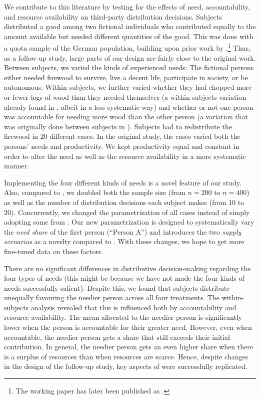 \documentclass[egregdoesnotlikesansseriftitles]{scrartcl}
\begin{document}
We contribute to this literature by testing for the effects of need, accountability, and resource availability on third-party distribution decisions.
Subjects distributed a good among two fictional individuals who contributed equally to the amount available but needed different quantities of the good.
This was done with a quota sample of the German population, building upon prior work by \cite{bauer_need_2020}.\footnote{The working paper \cite{bauer_need_2020} has later been published as \cite{bauer_need_2022}.}
Thus, as a follow-up study, large parts of our design are fairly close to the original work.
Between subjects, we varied the kinds of experienced needs: The fictional persons either needed firewood to survive, live a decent life, participate in society, or be autonomous.
Within subjects, we further varied whether they had chopped more or fewer logs of wood than they needed themselves (a within-subjects variation already found in \citealt{bauer_need_2020}, albeit in a less systematic way) and whether or not one person was accountable for needing more wood than the other person (a variation that was originally done between subjects in \citealt{bauer_need_2020}).
Subjects had to redistribute the firewood in 20 different cases.
In the original study, the cases varied both the persons' needs and productivity.
We kept productivity equal and constant in order to alter the need as well as the resource availability in a more systematic manner.

Implementing the four different kinds of needs is a novel feature of our study.
Also, compared to \cite{bauer_need_2020}, we doubled both the sample size (from $n=200$ to $n=400$) as well as the number of distribution decisions each subject makes (from 10 to 20).
Concurrently, we changed the parametrization of all cases instead of simply adopting some from \cite{bauer_need_2020}.
Our new parametrization is designed to systematically vary the \textit{need share} of the first person (``Person A'') and introduces the two \textit{supply scenarios} as a novelty compared to \cite{bauer_need_2020}.
With these changes, we hope to get more fine-tuned data on these factors.

There are no significant differences in distributive decision-making regarding the four types of needs (this might be because we have not made the four kinds of needs successfully salient).
Despite this, we found that subjects distribute unequally favouring the needier person across all four treatments.
The within-subjects analysis revealed that this is influenced both by accountability and resource availability.
The mean allocated to the needier person is significantly lower when the person is accountable for their greater need.
However, even when accountable, the needier person gets a share that still exceeds their initial contribution.
In general, the needier person gets an even higher share when there is a surplus of resources than when resources are scarce.
Hence, despite changes in the design of the follow-up study, key aspects of \citealt{bauer_need_2020} were successfully replicated.
\end{document}
